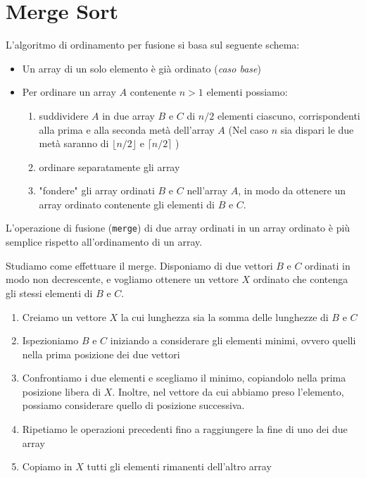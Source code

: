 \section{Merge Sort}
L'algoritmo di ordinamento per fusione si basa sul seguente schema:
\begin{itemize}
    \item Un array di un solo elemento è già ordinato (\emph{caso base})
    \item Per ordinare un array $A$ contenente $n > 1$ elementi possiamo:
    \begin{enumerate}
        \item suddividere $A$ in due array $B$ e $C$ di $n/2$ elementi ciascuno,
        corrispondenti alla prima e alla seconda metà dell'array $A$ (Nel caso $n$ 
        sia dispari le due metà saranno di $\lfloor n/2 \rfloor$ e $\lceil n/2 \rceil$ )
        \item ordinare separatamente gli array
        \item "fondere" gli array ordinati $B$ e $C$ nell'array $A$, in modo da
        ottenere un array ordinato contenente gli elementi di $B$ e $C$.
    \end{enumerate}
\end{itemize}

\noindent L'operazione di fusione ({\texttt{merge}}) di due array ordinati
in un array ordinato è più semplice rispetto all'ordinamento di un array.

\noindent Studiamo come effettuare il merge. Disponiamo di due vettori $B$ e $C$ ordinati
in modo non decrescente, e vogliamo ottenere un vettore $X$ ordinato che contenga
gli stessi elementi di $B$ e $C$.

\begin{enumerate}
    \item Creiamo un vettore $X$ la cui lunghezza sia la somma delle lunghezze di 
    $B$ e $C$
    \item Ispezioniamo $B$ e $C$ iniziando a considerare gli elementi minimi, ovvero quelli
    nella prima posizione dei due vettori
    \item Confrontiamo i due elementi e scegliamo il minimo, copiandolo nella 
    prima posizione libera di $X$. Inoltre, nel vettore da cui abbiamo preso
    l'elemento, possiamo considerare quello di posizione successiva.
    \item Ripetiamo le operazioni precedenti fino a raggiungere la fine di uno dei due array
    \item Copiamo in $X$ tutti gli elementi rimanenti dell'altro array
\end{enumerate}

